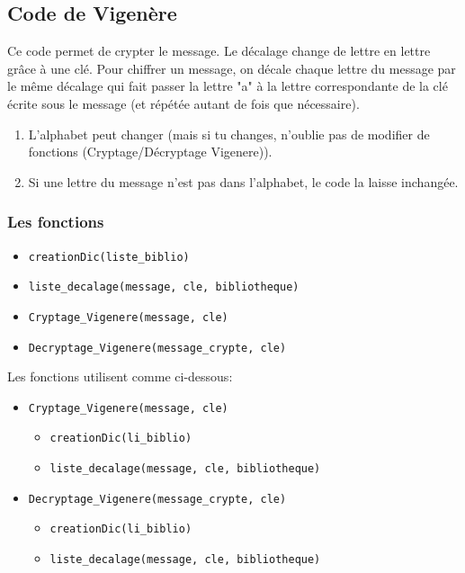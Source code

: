 \documentclass{article}
\begin{document}
\subsection{Code de Vigenère}
Ce code permet de crypter le message. Le décalage change de lettre en lettre grâce à une clé. Pour chiffrer un message, on décale chaque lettre du message par le même décalage qui fait passer la lettre "a" à la lettre correspondante de la clé écrite sous le message (et répétée autant de fois que nécessaire).

\begin{enumerate}
    \item L'alphabet peut changer (mais si tu changes, n'oublie pas de modifier de fonctions (Cryptage/Décryptage Vigenere)).
    \item Si une lettre du message n'est pas dans l'alphabet, le code la laisse inchangée.
\end{enumerate}

\subsubsection{Les fonctions}
\begin{itemize}
    \item \texttt{creationDic(liste\_biblio)}
    \item \texttt{liste\_decalage(message, cle, bibliotheque)}
    \item \texttt{Cryptage\_Vigenere(message, cle)}
    \item \texttt{Decryptage\_Vigenere(message\_crypte, cle)}
\end{itemize}

\leavevmode
\newline

Les fonctions utilisent comme ci-dessous:

\begin{itemize}
    \item \texttt{Cryptage\_Vigenere(message, cle)}
        \begin{itemize}
        \item \texttt{creationDic(li\_biblio)}
        \item \texttt{liste\_decalage(message, cle, bibliotheque)}
        \end{itemize}                    
    \item \texttt{Decryptage\_Vigenere(message\_crypte, cle)}
        \begin{itemize}
        \item \texttt{creationDic(li\_biblio)}
        \item \texttt{liste\_decalage(message, cle, bibliotheque)}
        \end{itemize}                
\end{itemize}
\end{document}
